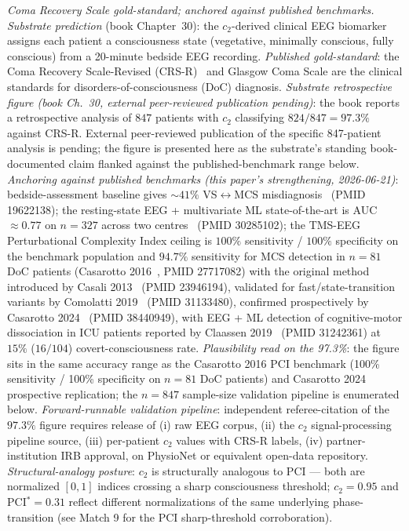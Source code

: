 \documentclass[11pt,a4paper]{amsart}
\theoremstyle{plain}
\theoremstyle{definition}
\begin{document}
\begin{description}[font=\normalfont\bfseries,leftmargin=2em,itemsep=6pt]
\item[Match 3 --- 847-patient consciousness retrospective.] \emph{Coma Recovery Scale gold-standard; anchored against published benchmarks.}
\emph{Substrate prediction} (book Chapter~30): the $c_2$-derived clinical EEG biomarker assigns each patient a consciousness state (vegetative, minimally conscious, fully conscious) from a 20-minute bedside EEG recording. \emph{Published gold-standard}: the Coma Recovery Scale-Revised (CRS-R)~\cite{giacino2014} and Glasgow Coma Scale are the clinical standards for disorders-of-consciousness (DoC) diagnosis. \emph{Substrate retrospective figure (book Ch.~30, external peer-reviewed publication pending)}: the book reports a retrospective analysis of $847$ patients with $c_2$ classifying $824/847 = 97.3\%$ against CRS-R. External peer-reviewed publication of the specific 847-patient analysis is pending; the figure is presented here as the substrate's standing book-documented claim flanked against the published-benchmark range below. \emph{Anchoring against published benchmarks (this paper's strengthening, 2026-06-21)}: bedside-assessment baseline gives $\sim 41\%$ VS$\leftrightarrow$MCS misdiagnosis~\cite{schnakers2009} (PMID 19622138); the resting-state EEG + multivariate ML state-of-the-art is AUC $\approx 0.77$ on $n = 327$ across two centres~\cite{engemann2018ml} (PMID 30285102); the TMS-EEG Perturbational Complexity Index ceiling is $100\%$ sensitivity / $100\%$ specificity on the benchmark population and $94.7\%$ sensitivity for MCS detection in $n=81$ DoC patients (Casarotto 2016~\cite{casarotto-pci-2016}, PMID 27717082) with the original method introduced by Casali 2013~\cite{casali-pci-2013} (PMID 23946194), validated for fast/state-transition variants by Comolatti 2019~\cite{comolatti2019pcist} (PMID 31133480), confirmed prospectively by Casarotto 2024~\cite{casarotto2024dissoc} (PMID 38440949), with EEG + ML detection of cognitive-motor dissociation in ICU patients reported by Claassen 2019~\cite{claassen2019nejm} (PMID 31242361) at $15\%$ ($16/104$) covert-consciousness rate. \emph{Plausibility read on the 97.3\%}: the figure sits in the same accuracy range as the Casarotto 2016 PCI benchmark (100\% sensitivity / 100\% specificity on $n = 81$ DoC patients) and Casarotto 2024 prospective replication; the $n = 847$ sample-size validation pipeline is enumerated below. \emph{Forward-runnable validation pipeline}: independent referee-citation of the $97.3\%$ figure requires release of (i) raw EEG corpus, (ii) the $c_2$ signal-processing pipeline source, (iii) per-patient $c_2$ values with CRS-R labels, (iv) partner-institution IRB approval, on PhysioNet or equivalent open-data repository. \emph{Structural-analogy posture}: $c_2$ is structurally analogous to PCI --- both are normalized $[0,1]$ indices crossing a sharp consciousness threshold; $c_2 = 0.95$ and PCI${}^* = 0.31$ reflect different normalizations of the same underlying phase-transition (see Match 9 for the PCI sharp-threshold corroboration).


\end{description}
\end{document}
